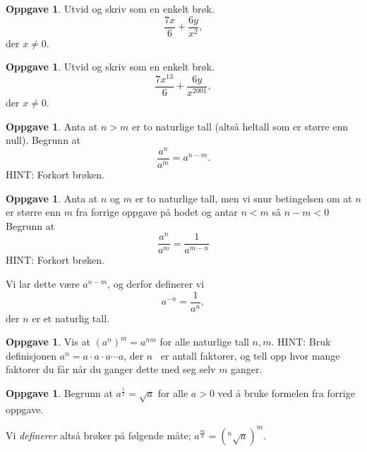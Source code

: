 \documentclass[11pt]{article}
\theoremstyle{definition}
\newtheorem{oppgave}[theorem]{Oppgave}
\theoremstyle{definition}
\begin{document}
\begin{oppgave}
Utvid og skriv som en enkelt brøk.
\[\frac{7x}{6} + \frac{6y}{x^{2}},\]
der $x \neq 0$.
\end{oppgave}


\begin{oppgave}
Utvid og skriv som en enkelt brøk.
\[\frac{7x^{13}}{6} + \frac{6y}{x^{2001}},\]
der $x \neq 0$.
\end{oppgave}


\begin{oppgave}
Anta at $n > m$ er to naturlige tall (altså heltall som er
        større enn null).
Begrunn at 
\[\frac{a^n}{a^m} = a^{n - m}.\]
HINT: Forkort brøken.
\end{oppgave}


\begin{oppgave}
Anta at $n$ og $m$ er to naturlige tall, men vi snur 
betingelsen om at $n$ er større enn $m$ fra forrige oppgave på
hodet og antar $n < m$ så $n - m < 0$
Begrunn at
\[\frac{a^n}{a^m} = \frac{1}{a^{m - n}} \]
HINT: Forkort brøken.

Vi lar dette være $a^{n - m}$, og derfor definerer vi
\[a^{-n} = \frac{1}{a^n} ,\] der $n$ er et naturlig tall.
\end{oppgave}

\begin{oppgave}
Vis at $(a^n)^m = a^{nm}$ for alle naturlige tall $n,m$.
HINT: Bruk definisjonen $a^n = a\cdot a\cdot a \cdots a$, der
$n$  er antall faktorer,
og tell opp hvor mange faktorer du får når du ganger dette med seg selv $m$
ganger.
\end{oppgave}


\begin{oppgave}
Begrunn at $a^{\frac{1}{2}} = \sqrt{a}$ for alle $a>0$ ved å bruke
formelen fra forrige oppgave.

Vi \emph{definerer} altså brøker på følgende måte;
$a^{\frac{m}{n}} = (^n\sqrt{a})^m$.
\end{oppgave}
\end{document}
